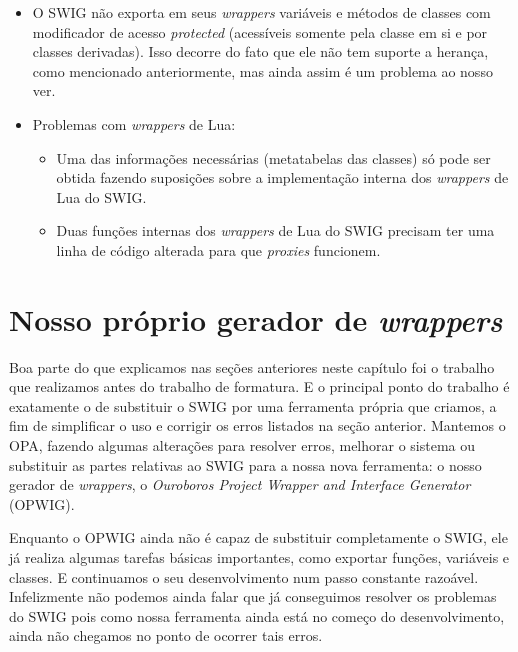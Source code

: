 \begin{itemize}
      
    \item O SWIG não exporta em seus \textit{wrappers} variáveis e métodos de classes com 
      modificador de acesso \textit{protected} (acessíveis somente pela classe em si e por 
      classes derivadas). Isso decorre do fato que ele não tem suporte a herança, como mencionado
      anteriormente, mas ainda assim é um problema ao nosso ver.
    \item Problemas com \textit{wrappers} de Lua:
      \begin{itemize}
        \item Uma das informações necessárias (metatabelas das classes) só pode ser obtida
          fazendo suposições sobre a implementação interna dos \textit{wrappers} de Lua do SWIG.
        \item Duas funções internas dos \textit{wrappers} de Lua do SWIG precisam ter uma linha
          de código alterada para que \textit{proxies} funcionem.
      \end{itemize}
  \end{itemize}
  
  \section{Nosso próprio gerador de \emph{wrappers}}
  \label{sec:actividads:opwig}
  Boa parte do que explicamos nas seções anteriores neste capítulo foi o trabalho que realizamos
  antes do trabalho de formatura. E o principal ponto do trabalho é exatamente o de substituir 
  o SWIG por uma ferramenta própria que criamos, a fim de simplificar o uso e corrigir os
  erros listados na seção anterior. Mantemos o OPA, fazendo algumas alterações para resolver
  erros, melhorar o sistema ou substituir as partes relativas ao SWIG para a nossa nova ferramenta:
  o nosso gerador de \textit{wrappers}, o \emph{Ouroboros Project Wrapper and Interface Generator} (OPWIG).
  
  Enquanto o OPWIG ainda não é capaz de substituir completamente o SWIG, ele já realiza algumas
  tarefas básicas importantes, como exportar funções, variáveis e classes. E continuamos
  o seu desenvolvimento num passo constante razoável. Infelizmente não podemos ainda falar que
  já conseguimos resolver os problemas do SWIG pois como nossa ferramenta ainda está no começo
  do desenvolvimento, ainda não chegamos no ponto de ocorrer tais erros. 
  

